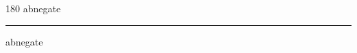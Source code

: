 
\begin{frame}
\begin{center}
\begin{turn}{180}
{\fontsize{2.5cm}{1em}\selectfont abnegate}
\end{turn}
\vspace{1em}\par  
\hrule
\vspace{1em}\par  
{\fontsize{2.5cm}{1em}\selectfont abnegate}
\end{center}
\end{frame}
